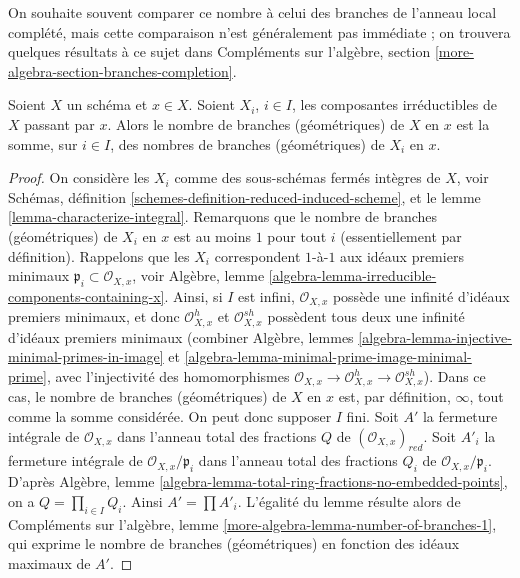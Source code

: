 \noindent
On souhaite souvent comparer ce nombre à celui des branches de l'anneau local
complété, mais cette comparaison n'est généralement pas immédiate ; on trouvera
quelques résultats à ce sujet dans Compléments sur l'algèbre, section
\ref{more-algebra-section-branches-completion}.

\begin{lemma}
\label{lemma-number-of-branches-irreducible-components}
Soient $X$ un schéma et $x \in X$. Soient $X_i$, $i \in I$, les
composantes irréductibles de $X$ passant par $x$.
Alors le nombre de branches (géométriques) de $X$ en $x$
est la somme, sur $i \in I$, des nombres de branches
(géométriques) de $X_i$ en $x$.
\end{lemma}

\begin{proof}
On considère les $X_i$ comme des sous-schémas fermés intègres de $X$,
voir Schémas, définition \ref{schemes-definition-reduced-induced-scheme}, et
le lemme \ref{lemma-characterize-integral}.
Remarquons que le nombre de branches (géométriques) de $X_i$ en $x$
est au moins $1$ pour tout $i$ (essentiellement par définition).
Rappelons que les $X_i$ correspondent $1$-à-$1$ aux idéaux
premiers minimaux $\mathfrak p_i \subset \mathcal{O}_{X, x}$, voir
Algèbre, lemme \ref{algebra-lemma-irreducible-components-containing-x}.
Ainsi, si $I$ est infini, $\mathcal{O}_{X, x}$ possède une
infinité d'idéaux premiers minimaux, et donc $\mathcal{O}_{X, x}^h$
et $\mathcal{O}_{X, x}^{sh}$ possèdent tous deux une infinité
d'idéaux premiers minimaux (combiner Algèbre, lemmes
\ref{algebra-lemma-injective-minimal-primes-in-image} et
\ref{algebra-lemma-minimal-prime-image-minimal-prime},
avec l'injectivité des homomorphismes
$\mathcal{O}_{X, x} \to  \mathcal{O}_{X, x}^h \to \mathcal{O}_{X, x}^{sh}$).
Dans ce cas, le nombre de branches (géométriques) de $X$ en $x$
est, par définition, $\infty$, tout comme la somme considérée.
On peut donc supposer $I$ fini.
Soit $A'$ la fermeture intégrale de $\mathcal{O}_{X, x}$
dans l'anneau total des fractions $Q$ de $(\mathcal{O}_{X, x})_{red}$.
Soit $A'_i$ la fermeture intégrale de $\mathcal{O}_{X, x}/\mathfrak p_i$
dans l'anneau total des fractions $Q_i$ de $\mathcal{O}_{X, x}/\mathfrak p_i$.
D'après Algèbre, lemme \ref{algebra-lemma-total-ring-fractions-no-embedded-points},
on a $Q = \prod_{i \in I} Q_i$. Ainsi $A' = \prod A'_i$.
L'égalité du lemme résulte alors de
Compléments sur l'algèbre, lemme \ref{more-algebra-lemma-number-of-branches-1},
qui exprime le nombre de branches (géométriques) en
fonction des idéaux maximaux de $A'$.
\end{proof}


